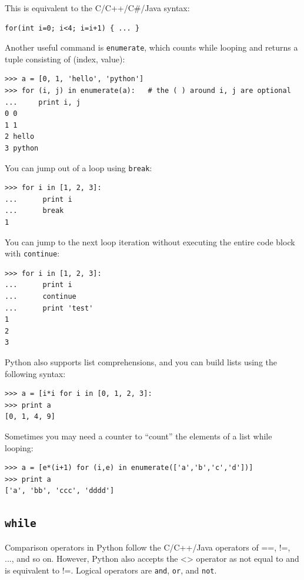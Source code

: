 \documentclass[justified,sixbynine]{tufte-book}
\def\ft{\small\tt}
\theoremstyle{plain}%
\theoremstyle{definition}
\theoremstyle{remark}
\begin{document}
\begin{fullwidth}
This is equivalent to the C/C++/C\#/Java syntax:

\begin{lstlisting}
for(int i=0; i<4; i=i+1) { ... }
\end{lstlisting}

Another useful command is {\ft enumerate}, which counts while looping and returns a tuple consisting of (index, value):
\begin{lstlisting}
>>> a = [0, 1, 'hello', 'python']
>>> for (i, j) in enumerate(a):   # the ( ) around i, j are optional
...     print i, j
0 0
1 1
2 hello
3 python
\end{lstlisting}

You can jump out of a loop using {\ft break}:
\begin{lstlisting}
>>> for i in [1, 2, 3]:
...      print i
...      break
1
\end{lstlisting}

You can jump to the next loop iteration without executing the entire code block with {\ft continue}:
\begin{lstlisting}
>>> for i in [1, 2, 3]:
...      print i
...      continue
...      print 'test'
1
2
3
\end{lstlisting}

Python also supports list comprehensions, and you can build lists using the following syntax:
\begin{lstlisting}
>>> a = [i*i for i in [0, 1, 2, 3]:
>>> print a
[0, 1, 4, 9]
\end{lstlisting}

Sometimes you may need a counter to ``count'' the elements of a list while looping:
\begin{lstlisting}
>>> a = [e*(i+1) for (i,e) in enumerate(['a','b','c','d'])]
>>> print a
['a', 'bb', 'ccc', 'dddd']
\end{lstlisting}


\goodbreak\subsection{{\ft while}}

Comparison operators in Python follow the C/C++/Java operators of ==, !=, ..., and so on.  However, Python also accepts the <> operator as not equal to and is equivalent to !=.  Logical operators are {\ft and}, {\ft or}, and {\ft not}.


\end{fullwidth}
\end{document}
